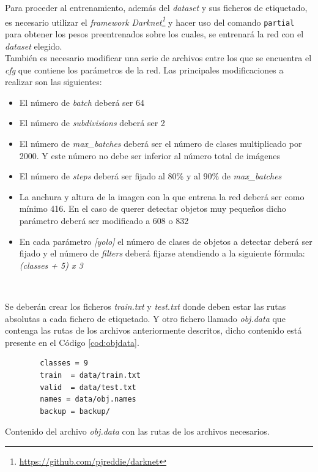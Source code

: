 Para proceder al entrenamiento, además del \textit{dataset} y sus ficheros de etiquetado, es necesario utilizar el \textit{framework} \textit{Darknet\footnote{\url{https://github.com/pjreddie/darknet}}} y hacer uso del comando \verb|partial| para obtener los pesos preentrenados sobre los cuales, se entrenará la red con el \textit{dataset} elegido.\\

También es necesario modificar una serie de archivos entre los que se encuentra el \textit{cfg} que contiene los parámetros de la red. Las principales modificaciones a realizar son las siguientes:
\begin{itemize}
	\item El número de \textit{batch} deberá ser 64
	\item El número de \textit{subdivisions} deberá ser 2
	\item El número de \textit{max\_batches} deberá ser el número de clases multiplicado por 2000. Y este número no debe ser inferior al número total de imágenes
	\item El número de \textit{steps} deberá ser fijado al 80\% y al 90\% de \textit{max\_batches}
	\item La anchura y altura de la imagen con la que entrena la red deberá ser como mínimo 416. En el caso de querer detectar objetos muy pequeños dicho parámetro deberá ser modificado a 608 o 832
	\item En cada parámetro \textit{[yolo]} el número de clases de objetos a detectar deberá ser fijado y el número de \textit{filters} deberá fijarse atendiendo a la siguiente fórmula: \textit{(classes + 5) x 3}
\end{itemize}\

Se deberán crear los ficheros \textit{train.txt} y \textit{test.txt} donde deben estar las rutas absolutas a cada fichero de etiquetado. Y otro fichero llamado \textit{obj.data} que contenga las rutas de los archivos anteriormente descritos, dicho contenido está presente en el Código \ref{cod:objdata}.\\

\begin{code}[h]
	\begin{lstlisting}
		classes = 9
		train  = data/train.txt
		valid  = data/test.txt
		names = data/obj.names
		backup = backup/
	\end{lstlisting}
	\caption[Contenido del archivo \textit{obj.data} con las rutas de los archivos necesarios.]{Contenido del archivo \textit{obj.data} con las rutas de los archivos necesarios.}
	\label{cod:objdata}
\end{code}

